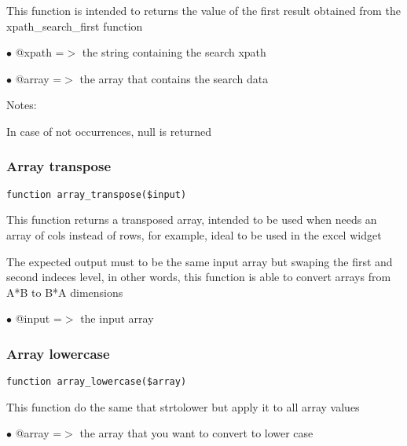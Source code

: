 \documentclass[a4paper]{article}
\begin{document}
This function is intended to returns the value of the first
result obtained from the xpath\_search\_first function

\begin{compactitem}
\item[\color{myblue}$\bullet$] @xpath =$>$ the string containing the search xpath
\item[\color{myblue}$\bullet$] @array =$>$ the array that contains the search data
\end{compactitem}

Notes:

In case of not occurrences, null is returned

\hypertarget{toc68}{}
\subsubsection{Array transpose}

\begin{lstlisting}
function array_transpose($input)
\end{lstlisting}

This function returns a transposed array, intended to be used
when needs an array of cols instead of rows, for example, ideal
to be used in the excel widget

The expected output must to be the same input array but swaping
the first and second indeces level, in other words, this function
is able to convert arrays from A*B to B*A dimensions

\begin{compactitem}
\item[\color{myblue}$\bullet$] @input =$>$ the input array
\end{compactitem}

\hypertarget{toc69}{}
\subsubsection{Array lowercase}

\begin{lstlisting}
function array_lowercase($array)
\end{lstlisting}

This function do the same that strtolower but apply it to all array values

\begin{compactitem}
\item[\color{myblue}$\bullet$] @array =$>$ the array that you want to convert to lower case
\end{compactitem}
\end{document}
